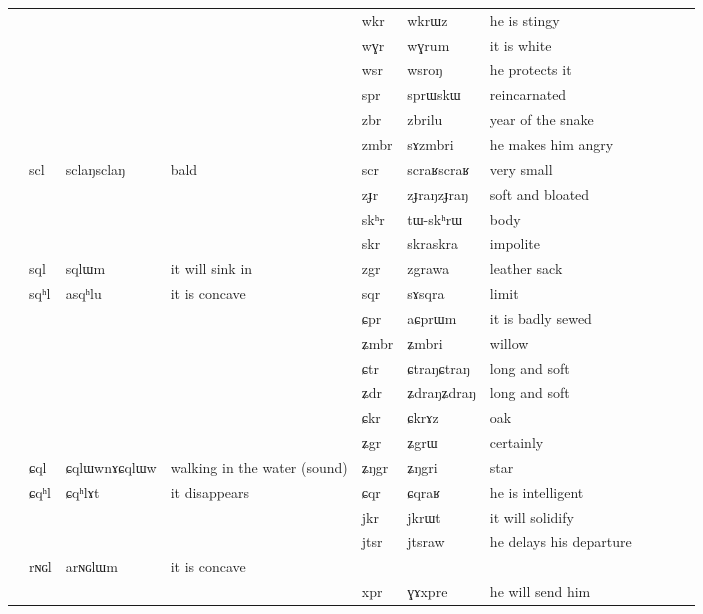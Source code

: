 \documentclass[oldfontcommands,oneside,a4paper,11pt]{article}
\newcommand{\ipa}[1]{{\phon #1}} %
\newcommand{\tib}[1]{\cellcolor{lightgray}\textbf{#1}}
\newcommand{\idph}[1]{\cellcolor{gray}\textbf{#1}}
\begin{document}
\begin{table}
{\begin{tabular}{l|lll|lll|lll|l}
\midrule
&&&&	\ipa{wkr}  & 	\ipa{wkrɯz}  &he is stingy \\
&&&&	\ipa{wɣr}  &	\ipa{wɣrum}  &it is white	\\
&&&  &	\ipa{wsr}  &	\ipa{wsroŋ}  &he protects it	\\
\midrule
&	&	&	&	\ipa{spr}  & 	\ipa{sprɯskɯ}  & 	 reincarnated	\\
&	&	&	&	\ipa{zbr}  \tib{} & 	\ipa{zbrilu}  & year of the snake	 	\\
&	&	&	&	\ipa{zmbr}  & 	\ipa{sɤzmbri}  & 	he makes him angry	\\
&	\ipa{scl}  \idph{}& 	\ipa{sclaŋsclaŋ}  & bald	&	\ipa{scr}  \idph{}& 	\ipa{scraʁscraʁ}  & 	very small&	\\
&	&	&	&	\ipa{zɟr} \idph{} & 	\ipa{zɟraŋzɟraŋ}  & 	soft and bloated	\\
&	&	&	&	\ipa{skʰr}  & 	\ipa{tɯ-skʰrɯ}  & 	body 	\\
&	&	&	&	\ipa{skr}  & 	\ipa{skraskra}  & impolite	 	\\
&	\ipa{sql}  & 	\ipa{sqlɯm}  &it will sink in 	&	\ipa{zgr} \tib{} & 	\ipa{zgrawa}    	&	leather sack\\
&	\ipa{sqʰl}  & 	\ipa{asqʰlu}  &it is concave 	&	\ipa{sqr}  & 	\ipa{sɤsqra}   	&	limit\\
\midrule
&	&	&	&	\ipa{ɕpr}  & 	\ipa{aɕprɯm}  & it is badly sewed	\\
&	&	&	&	\ipa{ʑmbr}  & 	\ipa{ʑmbri}  & willow	\\
&	&	&	&	\ipa{ɕtr}  \idph{}& 	\ipa{ɕtraŋɕtraŋ}  & long and soft	\\
&	&	&	&	\ipa{ʑdr}  \idph{}& 	\ipa{ʑdraŋʑdraŋ}  & 	 long and soft	\\
&	&	&	&	\ipa{ɕkr}  & 	\ipa{ɕkrɤz}  &oak 	\\
&	&	&	&	\ipa{ʑgr}  & 	\ipa{ʑgrɯ}  &certainly 	\\
&	\ipa{ɕql}  \idph{}& 	\ipa{ɕqlɯwnɤɕqlɯw}  &  walking in the water 	(sound)&	\ipa{ʑŋgr}  & 	\ipa{ʑŋgri}  &star 	\\
&	\ipa{ɕqʰl}  & 	\ipa{ɕqʰlɤt}  &it disappears 	&	\ipa{ɕqr}  & 	\ipa{ɕqraʁ}  & 	he is intelligent \\
\midrule						
&	&	&	&	\ipa{jkr}  & 	\ipa{jkrɯt}  & it will solidify \\
&	&	&	&\ipa{jtsr}  & 	\ipa{jtsraw}  &he delays his departure \\
	\midrule	
&	 	\ipa{rɴɢl}  & 	\ipa{arɴɢlɯm}  &it is concave &&&\\
&	&	&	& \ipa{xpr}  & 	\ipa{ɣɤxpre}  &he will send him \\

\end{tabular}}
\end{table}
\end{document}
